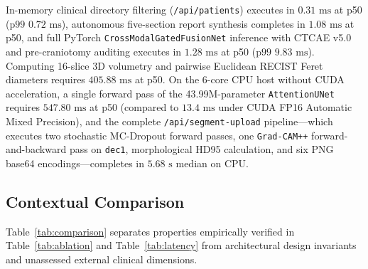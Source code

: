 \documentclass[conference]{IEEEtran}
\begin{document}
In-memory clinical directory filtering (\texttt{/api/patients}) executes in $0.31\text{ ms}$ at p50 ($\text{p99 } 0.72\text{ ms}$), autonomous five-section report synthesis completes in $1.08\text{ ms}$ at p50, and full PyTorch \texttt{CrossModalGatedFusionNet} inference with CTCAE v5.0 and pre-craniotomy auditing executes in $1.28\text{ ms}$ at p50 ($\text{p99 } 9.83\text{ ms}$). Computing 16-slice 3D volumetry and pairwise Euclidean RECIST Feret diameters requires $405.88\text{ ms}$ at p50. On the 6-core CPU host without CUDA acceleration, a single forward pass of the 43.99M-parameter \texttt{AttentionUNet} requires $547.80\text{ ms}$ at p50 (compared to $13.4\text{ ms}$ under CUDA FP16 Automatic Mixed Precision), and the complete \texttt{/api/segment-upload} pipeline---which executes two stochastic MC-Dropout forward passes, one \texttt{Grad-CAM++} forward-and-backward pass on \texttt{dec1}, morphological HD95 calculation, and six PNG base64 encodings---completes in $5.68\text{ s}$ median on CPU.

\subsection{Contextual Comparison}
Table~\ref{tab:comparison} separates properties empirically verified in Table~\ref{tab:ablation} and Table~\ref{tab:latency} from architectural design invariants and unassessed external clinical dimensions.
\end{document}
